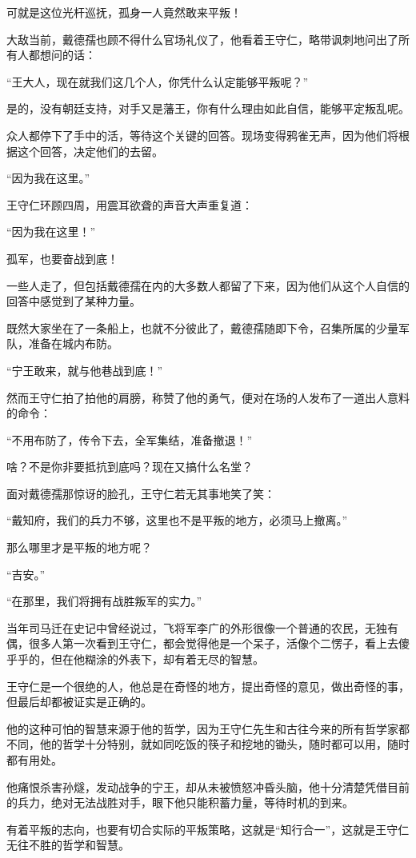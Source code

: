 \begin{multicols}{\theparacolNo}
可就是这位光杆巡抚，孤身一人竟然敢来平叛！

大敌当前，戴德孺也顾不得什么官场礼仪了，他看着王守仁，略带讽刺地问出了所有人都想问的话：

“王大人，现在就我们这几个人，你凭什么认定能够平叛呢？”

是的，没有朝廷支持，对手又是藩王，你有什么理由如此自信，能够平定叛乱呢。

众人都停下了手中的活，等待这个关键的回答。现场变得鸦雀无声，因为他们将根据这个回答，决定他们的去留。

“因为我在这里。”

王守仁环顾四周，用震耳欲聋的声音大声重复道：

“因为我在这里！”

孤军，也要奋战到底！

一些人走了，但包括戴德孺在内的大多数人都留了下来，因为他们从这个人自信的回答中感觉到了某种力量。

既然大家坐在了一条船上，也就不分彼此了，戴德孺随即下令，召集所属的少量军队，准备在城内布防。

“宁王敢来，就与他巷战到底！”

然而王守仁拍了拍他的肩膀，称赞了他的勇气，便对在场的人发布了一道出人意料的命令：

“不用布防了，传令下去，全军集结，准备撤退！”

啥？不是你非要抵抗到底吗？现在又搞什么名堂？

面对戴德孺那惊讶的脸孔，王守仁若无其事地笑了笑：

“戴知府，我们的兵力不够，这里也不是平叛的地方，必须马上撤离。”

那么哪里才是平叛的地方呢？

“吉安。”

“在那里，我们将拥有战胜叛军的实力。”

当年司马迁在史记中曾经说过，飞将军李广的外形很像一个普通的农民，无独有偶，很多人第一次看到王守仁，都会觉得他是一个呆子，活像个二愣子，看上去傻乎乎的，但在他糊涂的外表下，却有着无尽的智慧。

王守仁是一个很绝的人，他总是在奇怪的地方，提出奇怪的意见，做出奇怪的事，但最后却都被证实是正确的。

他的这种可怕的智慧来源于他的哲学，因为王守仁先生和古往今来的所有哲学家都不同，他的哲学十分特别，就如同吃饭的筷子和挖地的锄头，随时都可以用，随时都有用处。

他痛恨杀害孙燧，发动战争的宁王，却从未被愤怒冲昏头脑，他十分清楚凭借目前的兵力，绝对无法战胜对手，眼下他只能积蓄力量，等待时机的到来。

有着平叛的志向，也要有切合实际的平叛策略，这就是“知行合一”，这就是王守仁无往不胜的哲学和智慧。


\end{multicols}
